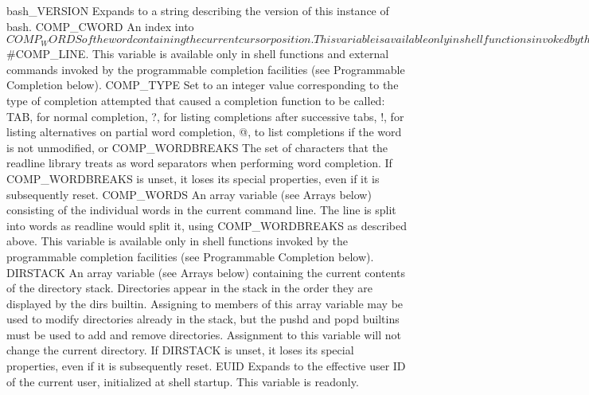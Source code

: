 \documentclass[11pt]{article}
\begin{document}
bash\_VERSION
Expands to a string describing the version of this instance of bash.
COMP_CWORD
An index into ${COMP_WORDS} of the word containing the current cursor position. This variable is available only in shell functions invoked by the programmable completion facilities (see Programmable Completion below).
COMP_KEY
The key (or final key of a key sequence) used to invoke the current completion function.
COMP_LINE
The current command line. This variable is available only in shell functions and external commands invoked by the programmable completion facilities (see Programmable Completion below).
COMP_POINT
The index of the current cursor position relative to the beginning of the current command. If the current cursor position is at the end of the current command, the value of this variable is equal to ${#COMP_LINE}. This variable is available only in shell functions and external commands invoked by the programmable completion facilities (see Programmable Completion below).
COMP_TYPE
Set to an integer value corresponding to the type of completion attempted that caused a completion function to be called: TAB, for normal completion, ?, for listing completions after successive tabs, !, for listing alternatives on partial word completion, @, to list completions if the word is not unmodified, or %
COMP_WORDBREAKS
The set of characters that the readline library treats as word separators when performing word completion. If COMP_WORDBREAKS is unset, it loses its special properties, even if it is subsequently reset.
COMP_WORDS
An array variable (see Arrays below) consisting of the individual words in the current command line. The line is split into words as readline would split it, using COMP_WORDBREAKS as described above. This variable is available only in shell functions invoked by the programmable completion facilities (see Programmable Completion below).
DIRSTACK
An array variable (see Arrays below) containing the current contents of the directory stack. Directories appear in the stack in the order they are displayed by the dirs builtin. Assigning to members of this array variable may be used to modify directories already in the stack, but the pushd and popd builtins must be used to add and remove directories. Assignment to this variable will not change the current directory. If DIRSTACK is unset, it loses its special properties, even if it is subsequently reset.
EUID
Expands to the effective user ID of the current user, initialized at shell startup. This variable is readonly.
\end{document}
